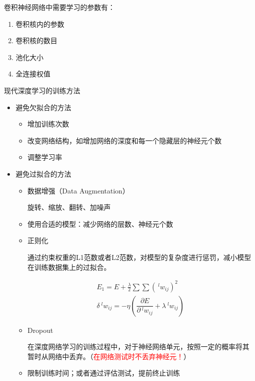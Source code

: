\begin{example}
    卷积神经网络中需要学习的参数有：
    \begin{enumerate}[A]
        \item \textcolor{main1}{卷积核内的参数}
        \item 卷积核的数目
        \item 池化大小
        \item \textcolor{main1}{全连接权值}
    \end{enumerate}
\end{example}
\begin{note}
    现代深度学习的训练方法
    \begin{itemize}
        \item 避免欠拟合的方法
        \begin{itemize}
            \item 增加训练次数
            \item 改变网络结构，如增加网络的深度和每一个隐藏层的神经元个数
            \item 调整学习率
        \end{itemize}
        \item 避免过拟合的方法
        \begin{itemize}
            \item 数据增强（Data Augmentation）
            
            旋转、缩放、翻转、加噪声
            \item 使用合适的模型：减少网络的层数、神经元个数
            \item 正则化
            
            通过约束权重的L1范数或者L2范数，对模型的复杂度进行惩罚，减小模型在训练数据集上的过拟合。

            \[
                \begin{array}{l}
                    E_1 = E+\frac{\lambda}{2}\sum\sum(\ ^{l}w_{ij})^2\\
                    \delta\ ^{l}w_{ij} = -\eta\left( \dfrac{\partial E}{\partial\ ^{l}w_{ij}}+\lambda\ ^{l}w_{ij} \right)
                \end{array}
            \]
            \item Dropout
            
            在深度网络学习的训练过程中，对于神经网络单元，按照一定的概率将其暂时从网络中丢弃。（\textcolor{red}{在网络测试时不丢弃神经元！}）
            \item 限制训练时间；或者通过评估测试，提前终止训练
            

\end{itemize}
\end{itemize}
\end{note}
